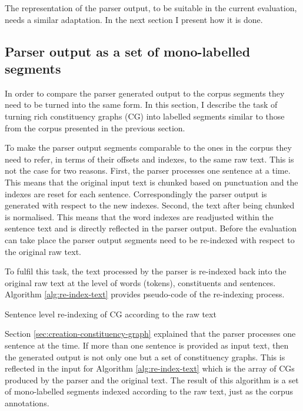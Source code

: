     The representation of the parser output, to be suitable in the current evaluation, needs a similar adaptation. In the next section I present how it is done. 

\subsection{Parser output as a set of mono-labelled segments}
    
    In order to compare the parser generated output to the corpus segments they need to be turned into the same form. In this section, I describe the task of turning rich constituency graphs (CG) into labelled segments similar to those from the corpus presented in the previous section. 
    
    To make the parser output segments comparable to the ones in the corpus they need to refer, in terms of their offsets and indexes, to the same raw text. This is not the case for two reasons. First, the parser processes one sentence at a time. This means that the original input text is chunked based on punctuation and the indexes are reset for each sentence. Correspondingly the parser output is generated with respect to the new indexes. Second, the text after being chunked is normalised. This means that the word indexes are readjusted within the sentence text and is directly reflected in the parser output. Before the evaluation can take place the parser output segments need to be re-indexed with respect to the original raw text. 
    
    To fulfil this task, the text processed by the parser is re-indexed back into the original raw text at the level of words (tokens), constituents and sentences. Algorithm \ref{alg:re-index-text} provides pseudo-code of the re-indexing process.
     
    \begin{algorithm}[!ht]
        \caption{Sentence level re-indexing of CG according to the raw text}
        \label{alg:re-index-text}
    \end{algorithm}

    Section \ref{sec:creation-constituency-graph} explained that the parser processes one sentence at the time. If more than one sentence is provided as input text, then the generated output is not only one but a set of constituency graphs. This is reflected in the input for Algorithm \ref{alg:re-index-text} which is the array of CGs produced by the parser and the original text. The result of this algorithm is a set of mono-labelled segments indexed according to the raw text, just as the corpus annotations. 
    
